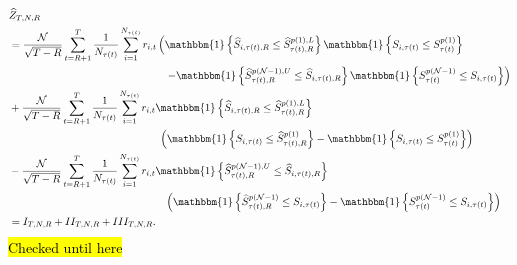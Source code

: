 \begin{align*}
&\widehat{Z}_{T,N,R} \\
&=\frac{\mathcal{N}}{\sqrt{T-R}}\sum_{t=R+1}^{T}\frac{1}{N_{\tau(t)}}\sum_{i=1}^{N_{\tau(t)}}r_{i,t}\left( \mathbbm{1}\left\{ \widehat{S}_{i,\tau(t),R}\leq \widehat{S}_{\tau(t),R}^{p(1),L}\right\} \mathbbm{1}\left\{ S_{i,\tau(t)}\leq S_{\tau(t)}^{p(1)}\right\} \right. \\
&\hspace{5.2cm} \left. -\mathbbm{1}\left\{ \widehat{S}_{\tau(t),R}^{p(\mathcal{N}-1),U} \leq \widehat{S}_{i,\tau(t),R} \right\} \mathbbm{1}\left\{ S_{\tau(t)}^{p(\mathcal{N}-1)} \leq S_{i,\tau(t)} \right\} \right) \\
&+\frac{\mathcal{N}}{\sqrt{T-R}}\sum_{t=R+1}^{T}\frac{1}{N_{\tau(t)}}\sum_{i=1}^{N_{\tau(t)}}r_{i,t} \mathbbm{1}\left\{ \widehat{S}_{i,\tau(t),R}\leq \widehat{S}_{\tau(t),R}^{p(1),L}\right\} \\
&\hspace{5.cm} \left( \mathbbm{1}\left\{ S_{i,\tau(t)}\leq \widehat{S}_{\tau(t),R}^{p(1)}\right\} -\mathbbm{1}\left\{ S_{i,\tau(t)}\leq S_{\tau(t)}^{p(1)}\right\} \right) \\
&-\frac{\mathcal{N}}{\sqrt{T-R}}\sum_{t=R+1}^{T}\frac{1}{N_{\tau(t)}}\sum_{i=1}^{N_{\tau(t)}}r_{i,t} \mathbbm{1}\left\{ \widehat{S}_{\tau(t),R}^{p(\mathcal{N}-1),U} \leq \widehat{S}_{i,\tau(t),R} \right\} \\
&\hspace{5.2cm} \left( \mathbbm{1}\left\{ \widehat{S}_{\tau(t),R}^{p(\mathcal{N}-1)} \leq S_{i,\tau(t)} \right\} -\mathbbm{1}\left\{ S_{\tau(t)}^{p(\mathcal{N}-1)} \leq S_{i,\tau(t)} \right\} \right) \\
&= I_{T,N,R}+II_{T,N,R}+III_{T,N,R}.
\end{align*} \hl{Checked until here}

